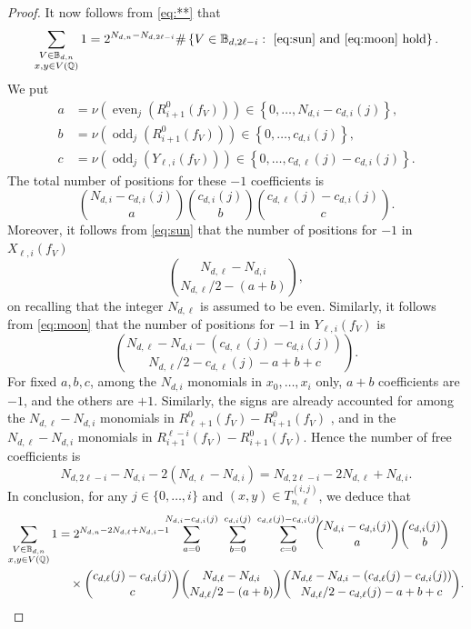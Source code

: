 \documentclass[11pt, reqno]{amsart}
\numberwithin{equation}{section}
\DeclareMathOperator{\even}{even}
\DeclareMathOperator{\odd}{odd}
\begin{document}
\begin{proof}
It now follows from \eqref{eq:**} that 
$$
\sum_{\substack{V \in \mathbb{B}_{d,n} \\ x, y \in V(\mathbb{Q})}} 1=
2^{N_{d,n}-N_{d,2\ell-i}} 
\#\left\{V \in \mathbb{B}_{d,2\ell-i} : 
\text{ \eqref{eq:sun} and \eqref{eq:moon} hold}
\right\}.
$$
We put 
\begin{align*}
a&=\nu\left( 
\even_j\left(R_{i+1}^0(f_V)\right)\right)\in \left\{0,\dots,N_{d,i}-c_{d,i}(j)\right\},\\
b&=\nu\left( 
\odd_j\left(R_{i+1}^0(f_V)\right)\right)\in \left\{0,\dots,c_{d,i}(j)\right\},\\
c&=\nu\left( 
\odd_j\left(Y_{\ell,i}(f_V)\right)\right)\in \left\{0,\dots,c_{d,\ell}(j)-c_{d,i}(j)\right\}.
\end{align*}
The total number of positions for these $-1$ coefficients is 
$$
\binom{N_{d,i}-c_{d,i}(j)}{a}
\binom{c_{d,i}(j)}{b}
\binom{c_{d,\ell}(j)-c_{d,i}(j)}{c}.
$$
Moreover, it follows from \eqref{eq:sun} that the number of positions for $-1$ in $X_{\ell,i}(f_V)$
$$
\binom{N_{d,\ell}-N_{d,i}}{N_{d,\ell}/2-(a+b)},
$$
on recalling that  the integer $N_{d,\ell}$ is assumed to be even. Similarly, 
it follows from \eqref{eq:moon} that the number of positions for $-1$ in $Y_{\ell,i}(f_V)$ 
is 
$$
\binom{N_{d,\ell}-N_{d,i} -(c_{d,\ell}(j)-c_{d,i}(j))}{N_{d,\ell}/2-c_{d,\ell}(j)-a+b+c}.
$$
For fixed $a,b,c$, among the $N_{d,i}$ monomials in $x_0,\dots,x_i$ only, $a+b$ coefficients are $-1$, and the others are $+1$. Similarly, the signs are already accounted for among the 
 $N_{d,\ell}-N_{d,i}$
monomials in 
$R_{\ell+1}^0(f_V)-R_{i+1}^0(f_V)$ , and in the $N_{d,\ell}-N_{d,i}$ monomials in 
$R_{i+1}^{\ell-i}(f_V)-R_{i+1}^0(f_V)$. Hence the number of free coefficients is 
$$
N_{d,2\ell-i}-N_{d,i}-2(N_{d,\ell}-N_{d,i})=
N_{d,2\ell-i}-2N_{d,\ell}+N_{d,i}.
$$
In conclusion, for any $j \in \{0, \dots, i\}$ and $(x, y) \in T_{n,\ell}^{(i,j)}$, we deduce that 
\begin{align*}
\sum_{\substack{V \in \mathbb{B}_{d,n} \\ x, y \in V(\mathbb{Q})}} 1 & =  2^{N_{d,n}-2N_{d,\ell}+N_{d,i}-1} 
\hspace{-0.2cm}
\sum_{a=0}^{N_{d,i}-c_{d,i}(j)} \ \sum_{b=0}^{c_{d,i}(j)}\
\sum_{c=0}^{c_{d,\ell}(j)-c_{d,i}(j)}
\hspace{-0.2cm}
 \binom{N_{d,i}-c_{d,i}(j)}{a} \binom{c_{d,i}(j)}{b} \\
&\quad\times \binom{c_{d,\ell}(j)-c_{d,i}(j)}{c}
 \binom{N_{d,\ell}-N_{d,i}}{N_{d,\ell}/2-(a+b)} 
\binom{N_{d,\ell}-N_{d,i} -(c_{d,\ell}(j)-c_{d,i}(j))}{N_{d,\ell}/2-c_{d,\ell}(j)-a+b+c} .

\end{align*}
\end{proof}
\end{document}
